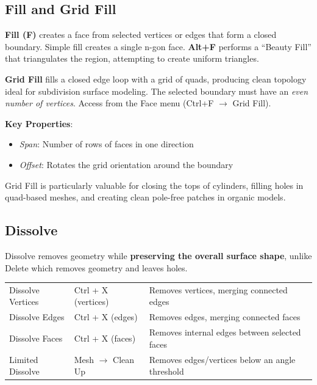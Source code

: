 \subsection{Fill and Grid Fill}
\label{sec:fill}

\textbf{Fill (F)} creates a face from selected vertices or edges that form a closed boundary. Simple fill creates a single n-gon face. \textbf{Alt+F} performs a ``Beauty Fill'' that triangulates the region, attempting to create uniform triangles.

\textbf{Grid Fill} fills a closed edge loop with a grid of quads, producing clean topology ideal for subdivision surface modeling. The selected boundary must have an \textit{even number of vertices}. Access from the Face menu (Ctrl+F $\rightarrow$ Grid Fill).

\textbf{Key Properties}:
\begin{itemize}[leftmargin=2em]
  \item \textit{Span}: Number of rows of faces in one direction
  \item \textit{Offset}: Rotates the grid orientation around the boundary
\end{itemize}

Grid Fill is particularly valuable for closing the tops of cylinders, filling holes in quad-based meshes, and creating clean pole-free patches in organic models.

\subsection{Dissolve}
\label{sec:dissolve}

Dissolve removes geometry while \textbf{preserving the overall surface shape}, unlike Delete which removes geometry and leaves holes.

\begin{center}
\begin{tabularx}{\textwidth}{L{3.5cm}C{3.5cm}X}
\toprule
{}
 &  &  \\
\midrule
Dissolve Vertices & Ctrl + X (vertices) & Removes vertices, merging connected edges \\
Dissolve Edges & Ctrl + X (edges) & Removes edges, merging connected faces \\
Dissolve Faces & Ctrl + X (faces) & Removes internal edges between selected faces \\
Limited Dissolve & Mesh $\rightarrow$ Clean Up & Removes edges/vertices below an angle threshold \\
\bottomrule
\end{tabularx}
\end{center}

